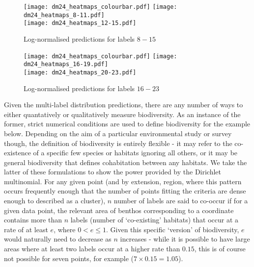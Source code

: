 \begin{figure}
    \texttt{[image: dm24\_heatmaps\_colourbar.pdf]}
    \texttt{[image: dm24\_heatmaps\_8-11.pdf]}\\
    \texttt{[image: dm24\_heatmaps\_12-15.pdf]}
    \caption{Log-normalised predictions for labels $8-15$}
    \label{fig:dm24_8-15}
\end{figure}

\begin{figure}
    \texttt{[image: dm24\_heatmaps\_colourbar.pdf]}
    \texttt{[image: dm24\_heatmaps\_16-19.pdf]}\\
    \texttt{[image: dm24\_heatmaps\_20-23.pdf]}
    \caption{Log-normalised predictions for labels $16-23$}
    \label{fig:dm24_16-23}
\end{figure}

Given the multi-label distribution predictions, there are any number of ways to either quantatively or qualitatively measure biodiversity. As an instance of the former, strict numerical conditions are used to define biodiversity for the example below. Depending on the aim of a particular environmental study or survey though, the definition of biodiversity is entirely flexible - it may refer to the co-existence of a specific few species or habitats ignoring all others, or it may be general biodiversity that defines cohabitation between any habitats. We take the latter of these formulations to show the power provided by the Dirichlet multinomial. For any given point (and by extension, region, where this pattern occurs frequently enough that the number of points fitting the criteria are dense enough to described as a cluster), $n$ number of labels are said to co-occur if for a given data point, the relevant area of benthos corresponding to a coordinate contains more than $n$ labels (number of `co-existing' habitats) that occur at a rate of at least $e$, where $0 < e \leq 1$. Given this specific `version' of biodiversity, $e$ would naturally need to decrease as $n$ increases - while it is possible to have large areas where at least two labels occur at a higher rate than $0.15$, this is of course not possible for seven points, for example ($7\times0.15=1.05$).



